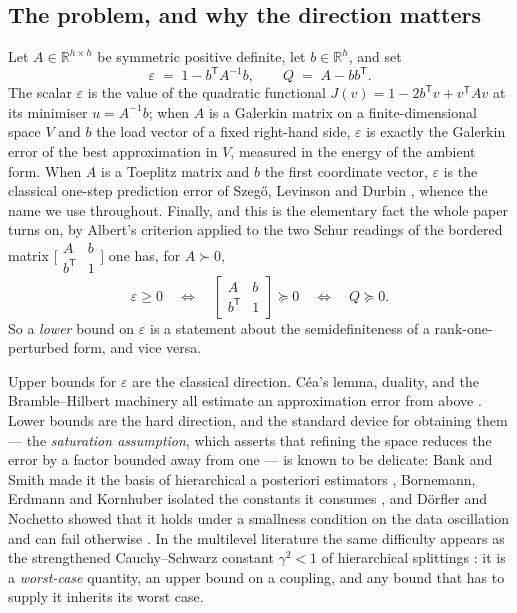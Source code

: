 \documentclass[11pt,a4paper]{article}
\theoremstyle{plain}
\theoremstyle{definition}
\newcommand{\R}{\mathbb{R}}
\newcommand{\T}{\mathsf{T}}
\newcommand{\PSD}{\succeq 0}
\newcommand{\PD}{\succ 0}
\begin{document}
\subsection{The problem, and why the direction matters}

Let $A\in\R^{h\times h}$ be symmetric positive definite, let $b\in\R^{h}$, and set
\begin{equation}
\label{eq:eps-def}
  \varepsilon \;=\; 1-b^{\T}A^{-1}b,
  \qquad
  Q \;=\; A-bb^{\T}.
\end{equation}
The scalar $\varepsilon$ is the value of the quadratic functional
$J(v)=1-2b^{\T}v+v^{\T}Av$ at its minimiser $u=A^{-1}b$; when $A$ is a Galerkin
matrix on a finite-dimensional space $V$ and $b$ the load vector of a fixed
right-hand side, $\varepsilon$ is exactly the Galerkin error of the best
approximation in $V$, measured in the energy of the ambient form. When $A$ is a
Toeplitz matrix and $b$ the first coordinate vector, $\varepsilon$ is the classical
one-step prediction error of Szeg\H{o}, Levinson and Durbin
\cite{Szego1939,GrenanderSzego1958,Levinson1947,Durbin1960}, whence the name we use
throughout. Finally, and this is the elementary fact the whole paper turns on, by
Albert's criterion applied to the two Schur readings of the bordered matrix
$\bigl[\begin{smallmatrix}A&b\\b^{\T}&1\end{smallmatrix}\bigr]$ one has, for $A\PD$,
\begin{equation}
\label{eq:albert-eps}
  \varepsilon\ge 0
  \quad\Longleftrightarrow\quad
  \begin{bmatrix}A & b\\ b^{\T} & 1\end{bmatrix}\PSD
  \quad\Longleftrightarrow\quad
  Q\PSD .
\end{equation}
So a \emph{lower} bound on $\varepsilon$ is a statement about the semidefiniteness of
a rank-one-perturbed form, and vice versa.

Upper bounds for $\varepsilon$ are the classical direction. C\'ea's lemma, duality,
and the Bramble--Hilbert machinery all estimate an approximation error from above
\cite{Cea1964}. Lower bounds are the hard direction, and the standard device for
obtaining them --- the \emph{saturation assumption}, which asserts that refining the
space reduces the error by a factor bounded away from one --- is known to be delicate:
Bank and Smith made it the basis of hierarchical a posteriori estimators
\cite{BankSmith1993}, Bornemann, Erdmann and Kornhuber isolated the constants it
consumes \cite{BornemannErdmannKornhuber1996}, and D\"orfler and Nochetto showed that
it holds under a smallness condition on the data oscillation and can fail otherwise
\cite{DorflerNochetto2002}. In the multilevel literature the same difficulty appears
as the strengthened Cauchy--Schwarz constant $\gamma^{2}<1$ of hierarchical
splittings \cite{Yserentant1986,BPX1990,AxelssonVassilevski1989,Brandt1977}: it is a
\emph{worst-case} quantity, an upper bound on a coupling, and any bound that has to
supply it inherits its worst case.
\end{document}
